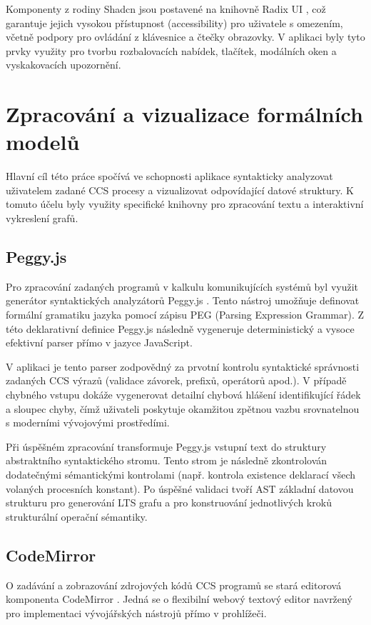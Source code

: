 Komponenty z rodiny Shadcn jsou postavené na knihovně Radix UI \cite{radixui_2025_primitives}, což garantuje jejich vysokou přístupnost (accessibility) pro uživatele s omezením, včetně podpory pro ovládání z klávesnice a čtečky obrazovky. 
V aplikaci byly tyto prvky využity pro tvorbu rozbalovacích nabídek, tlačítek, modálních oken a vyskakovacích upozornění. 

\section{Zpracování a vizualizace formálních modelů}
Hlavní cíl této práce spočívá ve schopnosti aplikace syntakticky analyzovat uživatelem zadané CCS procesy a vizualizovat odpovídající datové struktury. 
K tomuto účelu byly využity specifické knihovny pro zpracování textu a interaktivní vykreslení grafů.

\subsection{Peggy.js}
Pro zpracování zadaných programů v kalkulu komunikujících systémů byl využit generátor syntaktických analyzátorů Peggy.js \cite{peggyjs_2024_peggy}. 
Tento nástroj umožňuje definovat formální gramatiku jazyka pomocí zápisu PEG (Parsing Expression Grammar). 
Z této deklarativní definice Peggy.js následně vygeneruje deterministický a vysoce efektivní parser přímo v jazyce JavaScript.

V aplikaci je tento parser zodpovědný za prvotní kontrolu syntaktické správnosti zadaných CCS výrazů (validace závorek, prefixů, operátorů apod.). 
V případě chybného vstupu dokáže vygenerovat detailní chybová hlášení identifikující řádek a sloupec chyby, čímž uživateli poskytuje okamžitou zpětnou vazbu srovnatelnou s moderními vývojovými prostředími. 

Při úspěšném zpracování transformuje Peggy.js vstupní text do struktury abstraktního syntaktického stromu. 
Tento strom je následně zkontrolován dodatečnými sémantickými kontrolami (např. kontrola existence deklarací všech volaných procesních konstant). 
Po úspěšné validaci tvoří AST základní datovou strukturu pro generování LTS grafu a pro konstruování jednotlivých kroků strukturální operační sémantiky.

\subsection{CodeMirror}
O zadávání a zobrazování zdrojových kódů CCS programů se stará editorová komponenta CodeMirror \cite{codemirrornet_2025_codemirror}. 
Jedná se o flexibilní webový textový editor navržený pro implementaci vývojářských nástrojů přímo v prohlížeči. 

